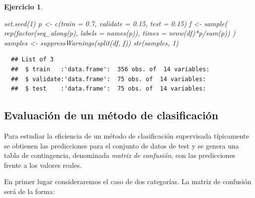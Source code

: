 \documentclass[
]{book}
\newenvironment{Shaded}{\begin{snugshade}}{\end{snugshade}}
\newcommand{\AttributeTok}[1]{\textcolor[rgb]{0.77,0.63,0.00}{#1}}
\newcommand{\DecValTok}[1]{\textcolor[rgb]{0.00,0.00,0.81}{#1}}
\newcommand{\FloatTok}[1]{\textcolor[rgb]{0.00,0.00,0.81}{#1}}
\newcommand{\FunctionTok}[1]{\textcolor[rgb]{0.00,0.00,0.00}{#1}}
\newcommand{\NormalTok}[1]{#1}
\newcommand{\OtherTok}[1]{\textcolor[rgb]{0.56,0.35,0.01}{#1}}
\newcommand{\SpecialCharTok}[1]{\textcolor[rgb]{0.00,0.00,0.00}{#1}}
\theoremstyle{break}
\newtheorem{exercise}{Ejercicio}[chapter]
\theoremstyle{nonumberplain}
\begin{document}
\begin{exercise}
\begin{Shaded}
\begin{Highlighting}[]
\FunctionTok{set.seed}\NormalTok{(}\DecValTok{1}\NormalTok{)}
\NormalTok{p }\OtherTok{\textless{}{-}} \FunctionTok{c}\NormalTok{(}\AttributeTok{train =} \FloatTok{0.7}\NormalTok{, }\AttributeTok{validate =} \FloatTok{0.15}\NormalTok{, }\AttributeTok{test =} \FloatTok{0.15}\NormalTok{)}
\NormalTok{f }\OtherTok{\textless{}{-}} \FunctionTok{sample}\NormalTok{( }\FunctionTok{rep}\NormalTok{(}\FunctionTok{factor}\NormalTok{(}\FunctionTok{seq\_along}\NormalTok{(p), }\AttributeTok{labels =} \FunctionTok{names}\NormalTok{(p)),}
                 \AttributeTok{times =} \FunctionTok{nrow}\NormalTok{(df)}\SpecialCharTok{*}\NormalTok{p}\SpecialCharTok{/}\FunctionTok{sum}\NormalTok{(p)) )}
\NormalTok{samples }\OtherTok{\textless{}{-}} \FunctionTok{suppressWarnings}\NormalTok{(}\FunctionTok{split}\NormalTok{(df, f))}
\FunctionTok{str}\NormalTok{(samples, }\DecValTok{1}\NormalTok{)}
\end{Highlighting}
\end{Shaded}

\begin{verbatim}
  ## List of 3
  ##  $ train   :'data.frame':  356 obs. of  14 variables:
  ##  $ validate:'data.frame':  75 obs. of  14 variables:
  ##  $ test    :'data.frame':  75 obs. of  14 variables:
\end{verbatim}

\end{exercise}

\hypertarget{eval-class}{%
\subsection{Evaluación de un método de clasificación}\label{eval-class}}

Para estudiar la eficiencia de un método de clasificación supervisada típicamente se obtienen las predicciones para el conjunto de datos de test y se genera una tabla de contingencia, denominada \emph{matriz de confusión}, con las predicciones frente a los valores reales.

En primer lugar consideraremos el caso de dos categorías.
La matriz de confusión será de la forma:
\end{document}
